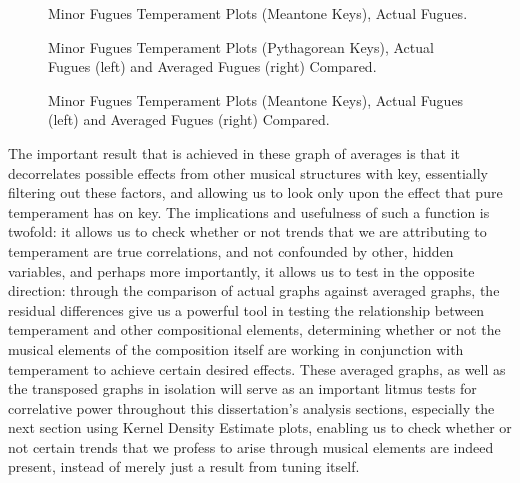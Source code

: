 \begin{figure}[H]
\vspace{1.5em}
    \centering
    \caption{Minor Fugues Temperament Plots (Meantone Keys), Actual Fugues. }
\end{figure}


\begin{figure}[H]
\vspace{1.5em}
    \centering
    \caption[Minor Fugues Temperament Plots (Pythagorean Keys), Actual Fugues and Averaged Fugues Compared. ]{Minor Fugues Temperament Plots (Pythagorean Keys), Actual Fugues (left) and Averaged Fugues (right) Compared.}
\end{figure}


\begin{figure}[H]
\vspace{1.5em}
    \centering
    \caption[Minor Fugues Temperament Plots (Meantone Keys), Actual Fugues and Averaged Fugues Compared. ]{Minor Fugues Temperament Plots (Meantone Keys), Actual Fugues (left) and Averaged Fugues (right) Compared.}
\end{figure}    The important result that is achieved in these graph of averages is that
it decorrelates possible effects from other musical structures with key,
essentially filtering out these factors, and allowing us to look only
upon the effect that pure temperament has on key. The implications and
usefulness of such a function is twofold: it allows us to check whether
or not trends that we are attributing to temperament are true
correlations, and not confounded by other, hidden variables, and perhaps
more importantly, it allows us to test in the opposite direction:
through the comparison of actual graphs against averaged graphs, the
residual differences give us a powerful tool in testing the relationship
between temperament and other compositional elements, determining
whether or not the musical elements of the composition itself are
working in conjunction with temperament to achieve certain desired
effects. These averaged graphs, as well as the transposed graphs in
isolation will serve as an important litmus tests for correlative power
throughout this dissertation's analysis sections, especially the next
section using Kernel Density Estimate plots, enabling us to check
whether or not certain trends that we profess to arise through musical
elements are indeed present, instead of merely just a result from tuning
itself.

